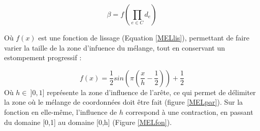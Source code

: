 \begin{equation}
  \beta = f(\prod_{e \in C} d_e)
\end{equation}

Où $f(x)$ est une fonction de lissage (Equation \ref{MELlis}),
permettant de faire varier la taille de la zone d'infuence du mélange,
tout en conservant un estompement progressif :

\begin{equation}
  f(x) = \frac{1}{2} sin(\pi(\frac{x}{h}-\frac{1}{2})) + \frac{1}{2}
  \label{MELlis}
\end{equation}
Où $h \in~ ]0,1]$ représente la zone d'influence de l'arête, ce qui
permet de délimiter la zone où le mélange de coordonnées doit être
fait (figure \ref{MELpar}). Sur la fonction en elle-même, l'influence
de $h$ correspond à une contraction, en passant du domaine [0,1] au
domaine [0,h] (Figure \ref{MELfon}).

